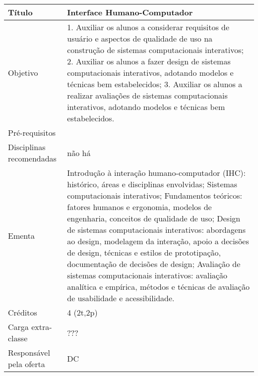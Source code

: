 \begin{center}
\begin{tabular}{|p{4.5cm}|p{10.0cm}|} \hline
Título & Interface Humano-Computador \\ \hline
Objetivo &

1. Auxiliar os alunos a considerar requisitos de usuário e aspectos de qualidade de uso na construção de sistemas computacionais interativos;
2. Auxiliar os alunos a fazer design de sistemas computacionais interativos, adotando modelos e técnicas bem estabelecidos; 
3. Auxiliar os alunos a realizar avaliações de sistemas computacionais interativos, adotando modelos e técnicas bem estabelecidos.



\\ \hline
Pré-requisitos & 

\\ \hline
Disciplinas recomendadas & não há \\ 

\hline
Ementa & Introdução à interação humano-computador (IHC): histórico, áreas e disciplinas envolvidas;  Sistemas computacionais interativos; Fundamentos teóricos: fatores humanos e ergonomia, modelos de engenharia, conceitos de qualidade de uso; Design de sistemas computacionais interativos: abordagens ao design, modelagem da interação, apoio a decisões de design, técnicas e estilos de prototipação, documentação de decisões de design;  Avaliação de sistemas computacionais interativos: avaliação analítica e empírica, métodos e técnicas de avaliação de usabilidade e acessibilidade. 



\\ \hline
Créditos & 4 (2t,2p) \\ \hline
Carga extra-classe & ???

\\ \hline
Responsável pela oferta & DC \\ \hline
\end{tabular}
\end{center}



